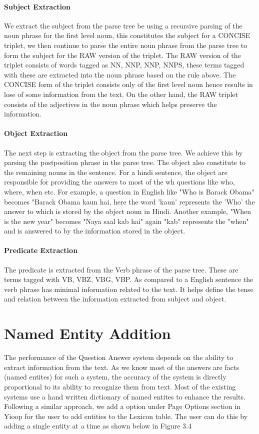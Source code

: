 \paragraph{Subject Extraction}
We extract the subject from the parse tree be using a recursive parsing of the noun phrase for the first level noun, this constitutes the subject for a CONCISE triplet, we then continue to parse the entire noun phrase from the parse tree to form the subject for the RAW version of the triplet. The RAW version of the triplet consists of words tagged as NN, NNP, NNP, NNPS, these terms tagged with these are extracted into the noun phrase based on the rule above. The CONCISE form of the triplet consists only of the first level noun hence results in lose of some information from the text. On the other hand, the RAW triplet consists of the adjectives in the noun phrase which helps preserve the information.

\paragraph{Object Extraction}
The next step is extracting the object from the parse tree. We achieve this by parsing the postposition phrase in the parse tree. The object also constitute to the remaining nouns in the sentence. For a hindi sentence, the object are responsible for providing the answers to most of the wh questions like who, where, when etc. For example, a question in English like "Who is Barack Obama"  becomes "Barack Obama kaun hai, here the word 'kaun' represents the 'Who' the answer to which is stored by the object noun in Hindi. Another example, "When is the new year" becomes "Naya saal kab hai" again "kab" represents the "when" and is answered to by the information stored in the object.

\paragraph{Predicate Extraction}
The predicate is extracted from the Verb phrase of the parse tree. These are terms tagged with VB, VBZ, VBG, VBP. As compared to a English sentence the verb phrase has minimal information related to the text. It helps define the tense and relation between the information extracted from subject and object.

\section{Named Entity Addition}
The performance of the Question Answer system depends on the ability to extract information from the text. As we know most of the answers are facts (named entites) for such a system, the accuracy of the system is directly proportional to its ability to recognize them from text. Most of the existing systems use a hand written dictionary of named entites to enhance the results. Following a similar approach, we add a option under Page Options section in Yioop for the user to add entities to the Lexicon table. The user can do this by adding a single entity at a time as shown below in Figure 3.4

